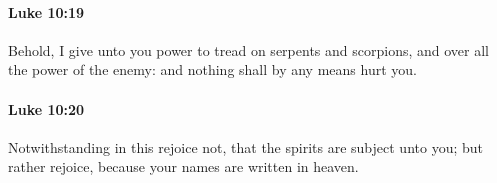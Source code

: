 		\paragraph{Luke 10:19} %
			\label{LUKE-10-19}

			Behold, I give unto you power to tread on serpents and scorpions, and over all the power of the enemy: and nothing shall by any means hurt you.

			\begin{framed}
			\scriptsize
				\begin{compactdesc}
					\item[SBLG]  \hyperref[EXOUSIA]{}  \hyperref[DUNAMIS]{} 
				\end{compactdesc}
			\end{framed}

		\paragraph{Luke 10:20} %
			\label{LUKE-10-20}

			Notwithstanding in this rejoice not, that the spirits are subject unto you; but rather rejoice, because your names are written in heaven.

